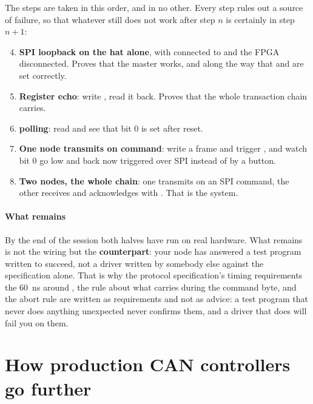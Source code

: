 The steps are taken in this order, and in no other. Every step rules out a source of failure, so that
whatever still does not work after step $n$ is certainly in step $n+1$:

\begin{enumerate}
  \setcounter{enumi}{3}
  \item \textbf{SPI loopback on the hat alone}, with  connected to  and the FPGA
    disconnected. Proves that the master works, and along the way that  and
     are set correctly.
  \item \textbf{Register echo}: write , read it back. Proves that the whole transaction
    chain carries.
  \item \textbf{ polling}: read  and see that bit 0 is set after reset.
  \item \textbf{One node transmits on command}: write a frame and trigger , and watch
     bit 0 go low and back \textemdash{} now triggered over SPI instead of by a button.
  \item \textbf{Two nodes, the whole chain}: one transmits on an SPI command, the other receives and
    acknowledges with . That is the system.
\end{enumerate}

\paragraph{What remains}
By the end of the session both halves have run on real hardware. What remains is not the wiring but
the \textbf{counterpart}: your node has answered a test program written to succeed, not a driver
written by somebody else against the specification alone. That is why the protocol specification's
timing requirements \textemdash{} the 60~ns around , the rule about what  carries
during the command byte, and the abort rule \textemdash{} are written as requirements and not as
advice: a test program that never does anything unexpected never confirms them, and a driver that does
will fail you on them.

\section{How production CAN controllers go further}
\label{c19:sec:gaps}

